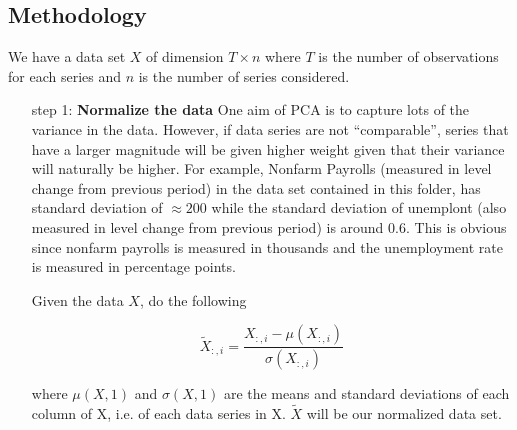 \documentclass[11pt]{article}
\theoremstyle{definition}
\begin{document}
\subsection{Methodology}
We have a data set $X$ of dimension $T\times n$ where $T$ is the number of observations for each series and $n$ is the number of series considered.
\begin{itemize}
\item[step 1:] \textbf{Normalize the data}\newline
One aim of PCA is to capture lots of the variance in the data. However, if data series are not ``comparable'', series that have a larger magnitude will be given higher weight given that their variance will naturally be higher. For example, Nonfarm Payrolls (measured in level change from previous period) in the data set contained in this folder, has standard deviation of $\approx 200$ while the standard deviation of unemplont (also measured in level change from previous period) is around $0.6$. This is obvious since nonfarm payrolls is measured in thousands and the unemployment rate is measured in percentage points. 

Given the data $X$, do the following

\begin{equation}
{\tilde{X}}_{:,i} = \frac{X_{:,i}-\mu(X_{:,i})}{\sigma(X_{:,i})}
\end{equation}

where $\mu(X,1)$ and $\sigma(X,1)$ are the means and standard deviations of each column of X, i.e. of each data series in X. $\tilde{X}$ will be our normalized data set.


\end{itemize}
\end{document}
